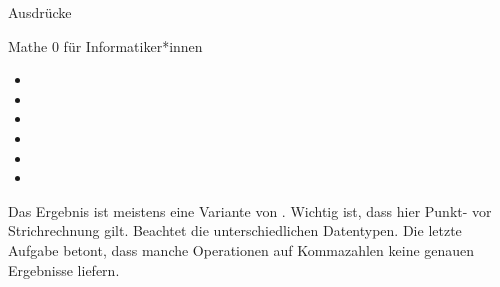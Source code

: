 \begin{task}[points=auto]{Ausdrücke }
\begin{subtask*}[points=0]{Mathe 0 für Informatiker*innen}
        \begin{multicols}{3}
            \begin{itemize}
                \item {}
                \item {}
                \item {}
                \item {}
                \item {}
                \item {}
            \end{itemize}
        \end{multicols}

        \begin{solution}
            Das Ergebnis ist meistens eine Variante von .
            Wichtig ist, dass hier Punkt- vor Strichrechnung gilt.
            Beachtet die unterschiedlichen Datentypen.
            Die letzte Aufgabe betont, dass manche Operationen auf Kommazahlen keine genauen Ergebnisse liefern.
        \end{solution}
    \end{subtask*}
\end{task}
